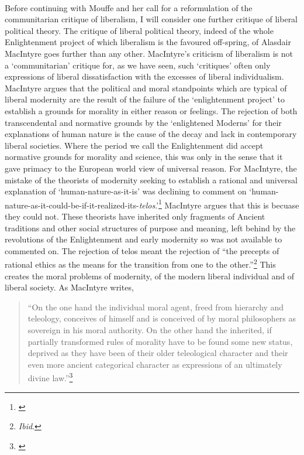 \documentclass[12pt,a4paper,titlepage]{article}
\begin{document}
\paragraph{}Before continuing with Mouffe and her call for a reformulation of the communitarian critique of liberalism, I will consider one further critique of liberal political theory. The critique of liberal political theory, indeed of the whole Enlightenment project of which liberalism is the favoured off-spring, of Alasdair MacIntyre goes further than any other. MacIntyre's criticism of liberalism is not a `communitarian' critique for, as we have seen, such `critiques' often only expressions of liberal dissatisfaction with the excesses of liberal individualism. MacIntyre argues that the political and moral standpoints which are typical of liberal modernity are the result of the failure of the `enlightenment project' to establish a grounds for morality in either reason or feelings. The rejection of both transcendental and normative grounds by the `enlightened Moderns' for their explanations of human nature is the cause of the decay and lack in contemporary liberal societies. Where the period we call the Enlightenment did accept normative grounds for morality and science, this was only in the sense that it gave primacy to the European world view of universal reason. For MacIntyre, the mistake of the theorists of modernity seeking to establish a rational and universal explanation of `human-nature-as-it-is' was declining to comment on `human-nature-as-it-could-be-if-it-realized-its-\textit{telos}.'\footnote{\cite[p. 53, orig. emph.]{MacIntyre:1981lr}} MacIntyre argues that this is becuase they could not. These theorists have inherited only fragments of Ancient traditions and other social structures of purpose and meaning, left behind by the revolutions of the Enlightenment and early modernity so was not available to commented on. The rejection of telos meant the rejection of ``the precepts of rational ethics as the means for the transition from one to the other.''\footnote{\textit{Ibid}.} This creates the moral problems of modernity, of the modern liberal individual and of liberal society. As MacIntyre writes,

\begin{quote}
``On the one hand the individual moral agent, freed from hierarchy and teleology, conceives of himself and is conceived of by moral philosophers as sovereign in his moral authority. On the other hand the inherited, if partially transformed rules of morality have to be found some new status, deprived as they have been of their older teleological character and their even more ancient categorical character as expressions of an ultimately divine law.''\footnote{\cite[p. 62]{MacIntyre:1981lr}}
\end{quote}
\end{document}
